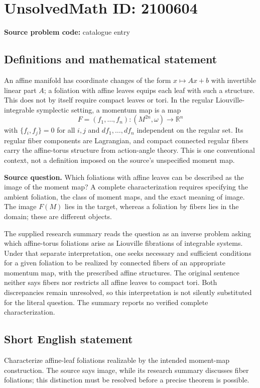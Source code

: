 \documentclass[11pt]{article}
\begin{document}
\section*{UnsolvedMath ID: 2100604}
\textbf{Source problem code:} catalogue entry
\subsection{Definitions and mathematical statement}
An affine manifold has coordinate changes of the form $x\mapsto Ax+b$ with invertible linear part $A$; a foliation with affine leaves equips each leaf with such a structure. This does not by itself require compact leaves or tori. In the regular Liouville-integrable symplectic setting, a momentum map is a map
\[
F=(f_1,\ldots,f_n):(M^{2n},\omega)\longrightarrow\mathbb R^n
\]
with $\{f_i,f_j\}=0$ for all $i,j$ and $df_1,\ldots,df_n$ independent on the regular set. Its regular fiber components are Lagrangian, and compact connected regular fibers carry the affine-torus structure from action-angle theory. This is one conventional context, not a definition imposed on the source's unspecified moment map.

\textbf{Source question.} Which foliations with affine leaves can be described as the image of the moment map? A complete characterization requires specifying the ambient foliation, the class of moment maps, and the exact meaning of image. The image $F(M)$ lies in the target, whereas a foliation by fibers lies in the domain; these are different objects.

The supplied research summary reads the question as an inverse problem asking which affine-torus foliations arise as Liouville fibrations of integrable systems. Under that separate interpretation, one seeks necessary and sufficient conditions for a given foliation to be realized by connected fibers of an appropriate momentum map, with the prescribed affine structures. The original sentence neither says fibers nor restricts all affine leaves to compact tori. Both discrepancies remain unresolved, so this interpretation is not silently substituted for the literal question. The summary reports no verified complete characterization.
\subsection{Short English statement}
Characterize affine-leaf foliations realizable by the intended moment-map construction. The source says image, while its research summary discusses fiber foliations; this distinction must be resolved before a precise theorem is possible.
\end{document}
